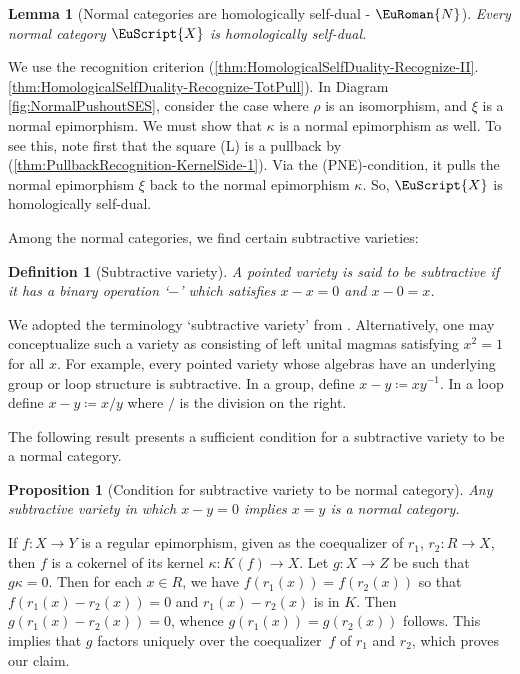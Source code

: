 \documentclass [12pt,oneside]{book}%
\makeatletter
\theoremstyle{captionstyle}  %
\newtheorem{definition}[theorem]{Definition}
\newtheorem{proposition}[theorem]{Proposition}
\newtheorem{lemma}[theorem]{Lemma}
\renewenvironment{proof}[1][\proofname]{\vspace{-2ex}\par       %
	\pushQED{\qed}%
	\normalfont \topsep6\p@\@plus6\p@\relax
	\trivlist
	\item[\hskip\labelsep
	            \color{proofcaption}\bfseries                %
	            #1\@addpunct{\quad}]\ignorespaces
}{%
	\popQED\endtrivlist\@endpefalse
}
\newcommand{\Defn}[1]{\emph{#1}}
\newcommand{\DefEq}{\coloneq} 		%
\newcommand{\from}{\colon}				%
\newcommand{\Ctgry}[1]{\EuScript{#1}}					%
\newcommand{\Ker}[1]{\textit{K}(#1)}		     	%
\newcommand{\NTag}{ - {\color{Brown} $\EuRoman{N}$}}																				%
\newcommand{\PNEInline}{(PNE)}																%
\makeatother
\begin{document}
\begin{lemma}[Normal categories are homologically self-dual\NTag]
    \label{thm:NormalCat->HomologicallySelfDual}%
    Every normal category $\Ctgry{X}$ is homologically self-dual. %
\end{lemma}
\begin{proof}
    We use the recognition criterion (\ref{thm:HomologicalSelfDuality-Recognize-II}.\ref{thm:HomologicalSelfDuality-Recognize-TotPull}). In Diagram \eqref{fig:NormalPushoutSES}, consider the case where $\rho$ is an isomorphism, and $\xi$ is a normal epimorphism. We must show that $\kappa$ is a normal epimorphism as well. To see this, note first that the square (L) is a pullback by (\ref{thm:PullbackRecognition-KernelSide-1}). Via the \PNEInline-condition, it pulls the normal epimorphism $\xi$ back to the normal epimorphism $\kappa$. So, $\Ctgry{X}$ is homologically self-dual.
\end{proof}


Among the normal categories, we find certain subtractive varieties:

\begin{definition}[Subtractive variety]
    \label{def:SubtractiveVariety}%
    A pointed variety is said to be \Defn{subtractive} if it has a binary operation `$-$' which satisfies $x-x=0$ and $x-0=x$. %
\end{definition}

We adopted the terminology `subtractive variety' from \cite{ZJanelidze-Snake}. Alternatively, one may conceptualize such a variety as consisting of left unital magmas satisfying $x^2=1$ for all $x$. For example, every pointed variety whose algebras have an underlying group or loop structure is subtractive. In a group, define  $x-y\DefEq xy^{-1}$. In a loop define $x-y\DefEq x/y$ where $/$ is the division on the right.

The following result presents a sufficient condition for a subtractive variety to be a normal category.

\begin{proposition}[Condition for subtractive variety to be normal category]
    \label{thm:SubtractiveVariety->NormalCat}%
    Any subtractive variety in which $x-y=0$ implies $x=y$ is a normal category.
\end{proposition}
\begin{proof}
    If $f\from X\to Y$ is a regular epimorphism, given as the coequalizer of $r_1$, $r_2\from R\to X$, then $f$ is a cokernel of its kernel $\kappa\from {\Ker{f}\to X}$. Let $g\from X\to Z$ be such that $g\kappa=0$. Then for each $x\in R$, we have $f(r_1(x))=f(r_2(x))$ so that $f(r_1(x)-r_2(x))=0$ and $r_1(x)-r_2(x)$ is in $K$. Then $g(r_1(x)-r_2(x))=0$, whence $g(r_1(x))=g(r_2(x))$ follows. This implies that $g$ factors uniquely over the coequalizer~$f$ of $r_1$ and $r_2$, which proves our claim.
\end{proof}
\end{document}
